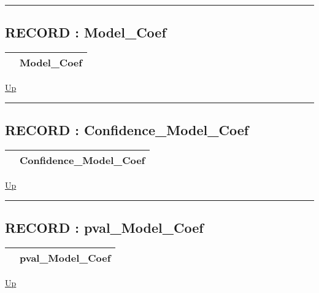 \rule{\textwidth}{0.4pt}
\subsection*{RECORD : Model\_Coef}
\hypertarget{ecldoc:logisticregression.types.model_coef}{}

{\renewcommand{\arraystretch}{1.5}
\begin{tabularx}{\textwidth}{|>{\raggedright\arraybackslash}l|X|}
\hline
\hspace{0pt} & Model\_Coef \\
\hline
\end{tabularx}
}

\hyperlink{ecldoc:LogisticRegression.Types}{Up}

\par


\rule{\textwidth}{0.4pt}
\subsection*{RECORD : Confidence\_Model\_Coef}
\hypertarget{ecldoc:logisticregression.types.confidence_model_coef}{}

{\renewcommand{\arraystretch}{1.5}
\begin{tabularx}{\textwidth}{|>{\raggedright\arraybackslash}l|X|}
\hline
\hspace{0pt} & Confidence\_Model\_Coef \\
\hline
\end{tabularx}
}

\hyperlink{ecldoc:LogisticRegression.Types}{Up}

\par


\rule{\textwidth}{0.4pt}
\subsection*{RECORD : pval\_Model\_Coef}
\hypertarget{ecldoc:logisticregression.types.pval_model_coef}{}

{\renewcommand{\arraystretch}{1.5}
\begin{tabularx}{\textwidth}{|>{\raggedright\arraybackslash}l|X|}
\hline
\hspace{0pt} & pval\_Model\_Coef \\
\hline
\end{tabularx}
}

\hyperlink{ecldoc:LogisticRegression.Types}{Up}

\par


